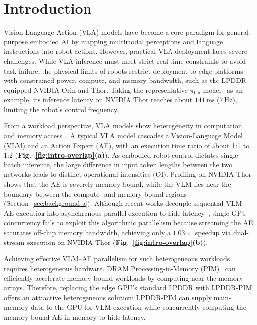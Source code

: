 \section{Introduction}
\label{sec:introduction}

Vision-Language-Action (VLA) models have become a core paradigm for general-purpose embodied AI by mapping multimodal perceptions and language instructions into robot actions. However, practical VLA deployment faces severe challenges. While VLA inference must meet strict real-time constraints to avoid task failure, the physical limits of robots restrict deployment to edge platforms with constrained power, compute, and memory bandwidth, such as the LPDDR-equipped NVIDIA Orin and Thor. Taking the representative $\pi_{0.5}$ model~\cite{pi05} as an example, its inference latency on NVIDIA Thor reaches about $141\,\mathrm{ms}$ ($7\,\mathrm{Hz}$), limiting the robot's control frequency.

From a workload perspective, VLA models show heterogeneity in computation and memory access~\cite{vla_perf}. A typical VLA model cascades a Vision-Language Model (VLM) and an Action Expert (AE), with an execution time ratio of about 1:1 to 1:2 (\textbf{Fig.~\ref{fig:intro-overlap}(a)}). As embodied robot control dictates single-batch inference, the large difference in input token lengths between the two networks leads to distinct operational intensities (OI). Profiling on NVIDIA Thor shows that the AE is severely memory-bound, while the VLM lies near the boundary between the compute- and memory-bound regions (Section~\ref{sec:background-a}). Although recent works decouple sequential VLM--AE execution into asynchronous parallel execution to hide latency~\cite{vla_xpu,ravel}, single-GPU concurrency fails to exploit this algorithmic parallelism because streaming the AE saturates off-chip memory bandwidth, achieving only a $1.03\times$ speedup via dual-stream execution on NVIDIA Thor (\textbf{Fig.~\ref{fig:intro-overlap}(b)}).



Achieving effective VLM--AE parallelism for such heterogeneous workloads requires heterogeneous hardware. DRAM Processing-in-Memory (PIM)~\cite{rowclone,ambit,fimdram,upmem_prism} can efficiently accelerate memory-bound workloads by computing near the memory arrays. Therefore, replacing the edge GPU's standard LPDDR with LPDDR-PIM offers an attractive heterogeneous solution: LPDDR-PIM can supply main-memory data to the GPU for VLM execution while concurrently computing the memory-bound AE in memory to hide latency.

